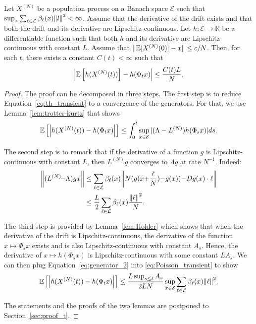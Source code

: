 \documentclass[sigconf]{acmart}
\newcommand\XN{X^{(N)}}
\newcommand\LN{L^{(N)}}
\newcommand\E{\mathcal{E}}
\newcommand\R{\mathbb{R}}
\newcommand\calL{\mathcal{L}}
\newcommand\esp[1]{{\mathchoice{\besp{#1}}{\sesp{#1}}{\sesp{#1}}{\sesp{#1}}}}
\newcommand\besp[1]{\mathbb{E}\left[#1\right]}
\newcommand\sesp[1]{\mathbb{E}[#1]}
\newcommand\norm[1]{{\mathchoice{\bnorm{#1}}{\snorm{#1}}{\snorm{#1}}{\snorm{#1}}}}
\newcommand\bnorm[1]{\left\|#1\right\|}
\newcommand\snorm[1]{\|#1\|}
\newcommand\abs[1]{\left|#1\right|}
\begin{document}
\begin{theorem}
  \label{th:transient}
  Let $\XN$ be a population process on a Banach space $\E$ such that
  $\sup_x\sum_{\ell\in\calL}\beta_\ell(x)\norm{l}^2<\infty$. Assume
  that the derivative of the drift exists and that both the drift and
  its derivative are Lipschitz-continuous.  Let $h:\E\to\R$ be a
  differentiable function such that both $h$ and its derivative are
  Lipschitz-continuous with constant $L$. Assume that
  $\snorm{\esp{\XN(0)}-x}\le c/N$. Then, for each $t$, there
  exists a constant $C(t)<\infty$ such that
  \begin{align}
    \label{eq:th_transient}
    \abs{\esp{h(\XN(t))} - h(\Phi_tx)} \le \frac{C(t)L}{N}.
  \end{align}
\end{theorem}

\begin{proof}
  The proof can be decomposed in three steps.  The first step is to
  reduce Equation~\eqref{eq:th_transient} to a convergence of the
  generators. For that, we use Lemma~\ref{lem:trotter-kurtz} that
  shows
  \begin{align}
    \esp{\abs{h(\XN(t))-h(\Phi_tx)}} \le
    \int_0^t\sup_{x\in\E}|(\Lambda-\LN)h(\Phi_sx)|ds.
    \label{eq:Poisson_transient}
  \end{align}
  
  The second step is to remark that if the derivative of a function
  $g$ is Lipschitz-continuous with constant $L$, then $\LN g$
  converges to $\Lambda g$ at rate $N^{-1}$. Indeed:
  \begin{align}
    \bigg\|(\LN\!{-}\Lambda)g x\bigg\|
    &\le \sum_{\ell\in\calL}
      \beta_\ell(x)\bigg\|N(g(x{+}\frac{\ell}{N}){-}g(x)){-}Dg(x)
      \cdot \ell \bigg\|\nonumber\\
    &\le \frac{L}{2}\sum_{\ell\in\calL} \beta_\ell(x)
      \frac{\norm{\ell}^{2}}{{N}}. 
      \label{eq:generator_2}
  \end{align}
  
  The third step is provided by Lemma~\ref{lem:Holder} which shows
  that when the derivative of the drift is Lipschitz-continuous, the
  derivative of the function $x\mapsto \Phi_s x$ exists and is also
  Lipschitz-continuous with constant $A_s$. Hence, the derivative of
  $x\mapsto h(\Phi_sx)$ is Lipschitz-continuous with some constant
  $LA_s$. We can then plug Equation~\eqref{eq:generator_2} into
  \eqref{eq:Poisson_transient} to show
  \begin{align*}
    \esp{\abs{h(\XN(t))-h(\Phi_tx)}} \le \frac{L\sup_{s\le
    t}A_s}{2LN}\sup_{x\in\E}\sum_{\ell\in\calL}\beta_\ell(x)\norm{\ell}^2.  
  \end{align*}
  
  The statements and the proofs of the two lemmas are postponed to
  Section~\ref{sec:proof_t}.
\end{proof}
\end{document}
